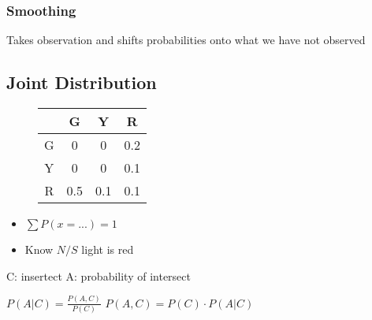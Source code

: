    \subsubsection{Smoothing}

      Takes observation and shifts probabilities onto what we have not observed

    \subsection{Joint Distribution}

      \begin{figure}[H]
        \centering
        \begin{tabular}{|c|c|c|c|}
          \hline
          & G & Y & R \\ \hline
          G & 0 & 0 & 0.2 \\ \hline
          Y & 0 & 0 & 0.1 \\ \hline
          R & 0.5 & 0.1 & 0.1 \\ \hline
        \end{tabular}
      \end{figure}

      \begin{itemize}
        \item $ \sum P (x = ...) = 1 $
        \item Know $ N/S $ light is red
      \end{itemize}

      C: insertect
      A: probability of intersect

      $ P(A|C) = \frac{P(A, C)}{P(C)} $
      $ P(A,C) = P(C) \cdot P(A|C) $
